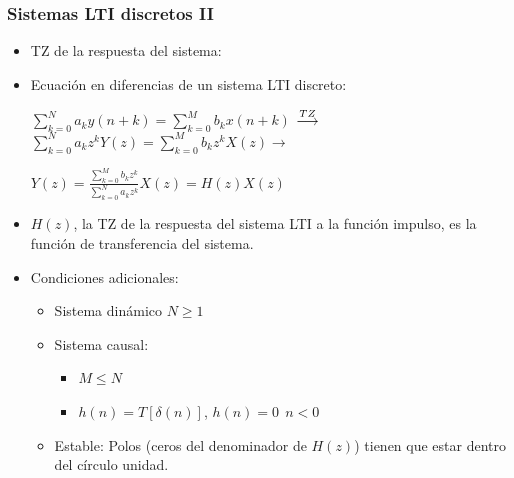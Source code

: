 

\begin{frame}
\frametitle{Sistemas LTI discretos II}

\vspace{-0,3cm}


\begin{itemize}

\item <1-> \alert{TZ de la respuesta del sistema}:

\vspace{0.2cm}


\vspace{0.2cm}

\item <2-> \alert{Ecuación en diferencias de un sistema LTI discreto:}

\vspace{0.2cm}


\hspace{-0.2cm} {\footnotesize $\sum_{k=0}^N {a_k {y(n\!+\!k)}}\!=\!\sum_{k=0}^M {b_k  x(n\!+\!k)}$   $\buildrel TZ \over  \longrightarrow$   $\sum_{k=0}^N a_k z^k Y(z)\!=\!\sum_{k=0}^M b_k z^k X(z)  \rightarrow $

\vspace{0.2cm}

\hspace{-0.2cm} $Y(z)=\frac{\sum_{k=0}^M b_k z^k}{\sum_{k=0}^N a_k z^k}X(z)=H(z)X(z)$}

\vspace{0.2cm}

\item $H(z)$, la TZ de la respuesta del sistema LTI a la función impulso, es la función de transferencia del sistema.

\vspace{0.2cm}

\item <3-> \alert{Condiciones adicionales:}

\begin{itemize}
\item Sistema dinámico $N \ge 1$
\item Sistema causal: 
\begin{itemize}
\item $M \le N$
 \item $h(n)=T[\delta(n)]$,  $h(n)=0 \: \: n<0$
\end{itemize}
\item Estable: Polos (ceros del denominador de $H(z)$) tienen que estar dentro del círculo unidad.
\end{itemize}


\end{itemize}
\end{frame}

